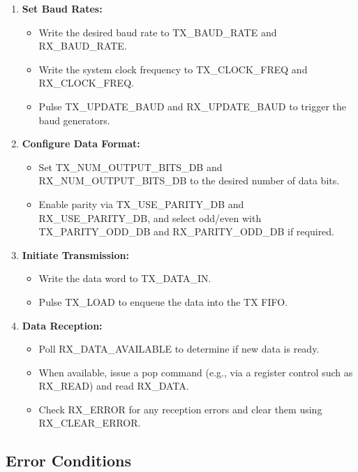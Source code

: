 \begin{enumerate}[noitemsep]
    \item \textbf{Set Baud Rates:}
    \begin{itemize}[noitemsep]
        \item Write the desired baud rate to TX\_BAUD\_RATE and RX\_BAUD\_RATE.
        \item Write the system clock frequency to TX\_CLOCK\_FREQ and RX\_CLOCK\_FREQ.
        \item Pulse TX\_UPDATE\_BAUD and RX\_UPDATE\_BAUD to trigger the baud generators.
    \end{itemize}
    
    \item \textbf{Configure Data Format:}
    \begin{itemize}[noitemsep]
        \item Set TX\_NUM\_OUTPUT\_BITS\_DB and RX\_NUM\_OUTPUT\_BITS\_DB to the desired number of data bits.
        \item Enable parity via TX\_USE\_PARITY\_DB and RX\_USE\_PARITY\_DB, and select odd/even with TX\_PARITY\_ODD\_DB and RX\_PARITY\_ODD\_DB if required.
    \end{itemize}
    
    \item \textbf{Initiate Transmission:}
    \begin{itemize}[noitemsep]
        \item Write the data word to TX\_DATA\_IN.
        \item Pulse TX\_LOAD to enqueue the data into the TX FIFO.
    \end{itemize}
    
    \item \textbf{Data Reception:}
    \begin{itemize}[noitemsep]
        \item Poll RX\_DATA\_AVAILABLE to determine if new data is ready.
        \item When available, issue a pop command (e.g., via a register control such as RX\_READ) and read RX\_DATA.
        \item Check RX\_ERROR for any reception errors and clear them using RX\_CLEAR\_ERROR.
    \end{itemize}
\end{enumerate}

\subsection{Error Conditions}

